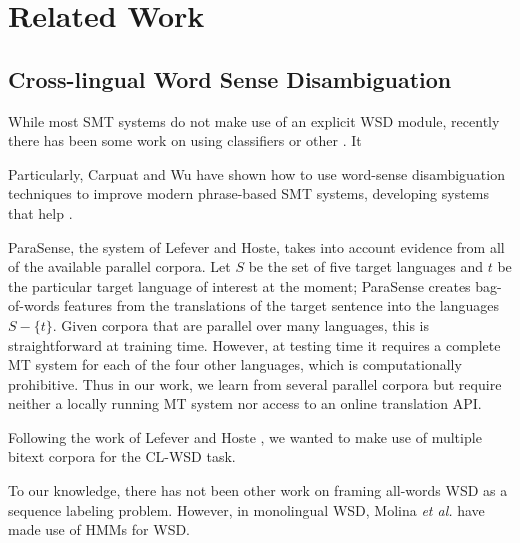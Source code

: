 \section{Related Work}
\label{sec:relatedwork}

\subsection{Cross-lingual Word Sense Disambiguation}

While most SMT systems do not make use of an explicit WSD module,
recently there has been some work on using classifiers or other . It 

Particularly, Carpuat and Wu have shown how to use word-sense disambiguation
techniques to improve modern phrase-based SMT systems, developing systems that
help 
\cite{carpuatpsd,carpuat-wu:2007:EMNLP-CoNLL2007,carpuat2008evaluation}.


\cite{vzabokrtsky-popel-marevcek:2010:WMT}


ParaSense, the system of Lefever
and Hoste, takes into account evidence from all of the available parallel
corpora. Let $S$ be the set of five target languages and $t$ be the particular
target language of interest at the moment; ParaSense creates bag-of-words
features from the translations of the target sentence into the languages $S -
\lbrace{t \rbrace}$.
Given corpora that are parallel over many languages, this is straightforward at
training time. However, at testing time it requires a complete MT system for
each of the four other languages, which is computationally prohibitive. Thus in
our work, we learn from several parallel corpora but require neither a locally
running MT system nor access to an online translation API.

Following the work of Lefever and Hoste
, we wanted to make use of
multiple bitext corpora for the CL-WSD task.

To our knowledge, there has not been other work on framing all-words WSD as a
sequence labeling problem. However, in monolingual WSD, Molina \textit{et al.}
have made use of HMMs for WSD. 



